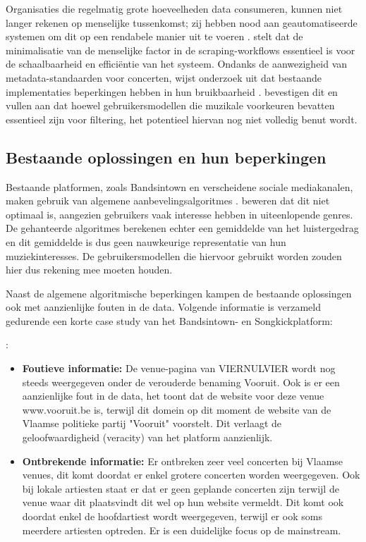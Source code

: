 Organisaties die regelmatig grote hoeveelheden data consumeren, kunnen niet langer rekenen op menselijke tussenkomst; zij hebben nood aan geautomatiseerde systemen om dit op een rendabele manier uit te voeren \autocite{Vording2020}. 
\textcite{Lin2021} stelt dat de minimalisatie van de menselijke factor in de scraping-workflows essentieel is voor de schaalbaarheid en efficiëntie van het systeem. 
Ondanks de aanwezigheid van metadata-standaarden voor concerten, wijst onderzoek uit dat bestaande implementaties beperkingen hebben in hun bruikbaarheid \autocite{Graves2003}. 
\textcite{Zangerle2018} bevestigen dit en vullen aan dat hoewel gebruikersmodellen die muzikale voorkeuren bevatten essentieel zijn voor filtering, het potentieel hiervan nog niet volledig benut wordt.

\subsection{Bestaande oplossingen en hun beperkingen}

Bestaande platformen, zoals Bandsintown en verscheidene sociale mediakanalen, maken gebruik van algemene aanbevelingsalgoritmes \autocite{Zangerle2018}. 
\textcite{Zangerle2018} beweren dat dit niet optimaal is, aangezien gebruikers vaak interesse hebben in uiteenlopende genres. 
De gehanteerde algoritmes berekenen echter een gemiddelde van het luistergedrag en dit gemiddelde is dus geen nauwkeurige representatie van hun muziekinteresses. 
De gebruikersmodellen die hiervoor gebruikt worden zouden hier dus rekening mee moeten houden.

Naast de algemene algoritmische beperkingen kampen de bestaande oplossingen ook met aanzienlijke fouten in de data. 
Volgende informatie is verzameld gedurende een korte case study van het Bandsintown- en Songkickplatform:

\textcite{Bandsintown}:
\begin{itemize}
    \item \textbf{Foutieve informatie:} De venue-pagina van VIERNULVIER wordt nog steeds weergegeven onder de verouderde benaming Vooruit. Ook is er een aanzienlijke fout in de data, het toont dat de website voor deze venue www.vooruit.be is, terwijl dit domein op dit moment de website van de Vlaamse politieke partij "Vooruit" voorstelt. Dit verlaagt de geloofwaardigheid (veracity) van het platform aanzienlijk.
    \item \textbf{Ontbrekende informatie:} Er ontbreken zeer veel concerten bij Vlaamse venues, dit komt doordat er enkel grotere concerten worden weergegeven. Ook bij lokale artiesten staat er dat er geen geplande concerten zijn terwijl de venue waar dit plaatsvindt dit wel op hun website vermeldt. Dit komt ook doordat enkel de hoofdartiest wordt weergegeven, terwijl er ook soms meerdere artiesten optreden. Er is een duidelijke focus op de mainstream.
\end{itemize}

